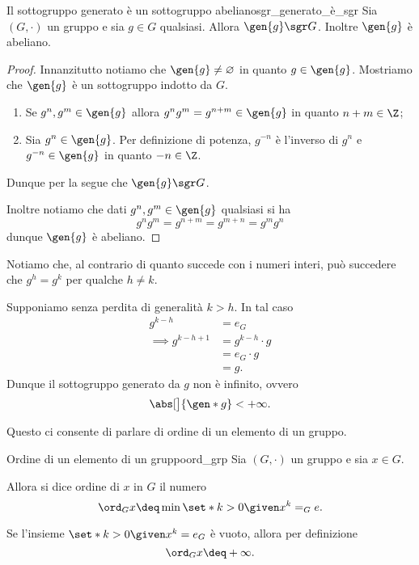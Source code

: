 \begin{proposition}
    {Il sottogruppo generato è un sottogruppo abeliano}{sgr_generato_è_sgr}
    Sia $(G, \cdot)$ un gruppo e sia $g \in G$ qualsiasi. Allora $\gen{g} \sgr G$. Inoltre $\gen{g}$ è abeliano.
\end{proposition}
\begin{proof}
    Innanzitutto notiamo che $\gen{g} \neq \varnothing$ in quanto $g \in \gen{g}$. Mostriamo che $\gen{g}$ è un sottogruppo indotto da $G$.

    \begin{enumerate}[label={(\roman*)}]
        \item Se $g^n, g^m \in \gen{g}$ allora $g^ng^m = g^{n+m} \in \gen{g}$ in quanto $n+m \in \Z$;
        \item Sia $g^n \in \gen{g}$. Per definizione di potenza, $g^{-n}$ è l'inverso di $g^n$ e $g^{-n} \in \gen{g}$ in quanto $-n \in \Z$. 
    \end{enumerate}

    Dunque per la  segue che $\gen{g} \sgr G$.

    Inoltre notiamo che dati $g^n, g^m \in \gen{g}$ qualsiasi si ha \[
        g^ng^m = g^{n+m} = g^{m+n} = g^mg^n    
    \] dunque $\gen{g}$ è abeliano.
\end{proof}

Notiamo che, al contrario di quanto succede con i numeri interi, può succedere che $g^h = g^k$ per qualche $h \neq k$.

Supponiamo senza perdita di generalità $k > h$. In tal caso \begin{align*}
    g^{k-h} &= e_G\\
    \implies g^{k-h+1} &= g^{k-h} \cdot g\\
    &= e_G \cdot g\\
    &= g.
\end{align*}
Dunque il sottogruppo generato da $g$ non è infinito, ovvero \[
    \abs[\big]{\gen*{g}} < +\infty.    
\]

Questo ci consente di parlare di ordine di un elemento di un gruppo.

\begin{definition}
    {Ordine di un elemento di un gruppo}{ord_grp}
    Sia $(G, \cdot)$ un gruppo e sia $x \in G$.

    Allora si dice ordine di $x$ in $G$ il numero \[
        \ord_{G}{x} \deq \min\set*{k > 0 \given x^k = _Ge}.    
    \]

    Se l'insieme $\set*{k > 0 \given x^k = e_G}$ è vuoto, allora per definizione \[
        \ord_{G}{x} \deq +\infty.
    \]
\end{definition}

